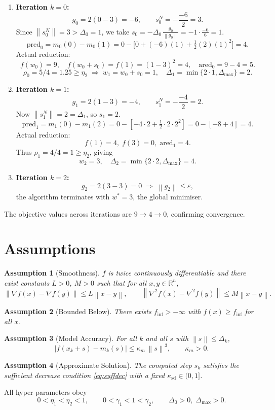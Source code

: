 \documentclass{article}
\newtheorem{assumption}{Assumption}
\newcommand{\RR}{\mathbb{R}}
\newcommand{\norm}[1]{\left\lVert#1\right\rVert}
\begin{document}
\begin{enumerate}
\item \textbf{Iteration $k=0$:}
\[
g_{0}=2(0-3)=-6,\qquad s_{0}^{N}= -\frac{-6}{2}=3.
\]
Since $\norm{s_{0}^{N}}=3>\Delta_{0}=1$, we take $s_{0}= -\Delta_{0}\,\frac{g_{0}}{\norm{g_{0}}}= -1\cdot\frac{-6}{6}=1$.
\[
\text{pred}_{0}=m_{0}(0)-m_{0}(1)=0- \bigl[0+(-6)(1)+\tfrac12(2)(1)^{2}\bigr]=4.
\]
Actual reduction:
\[
f(w_{0})=9,\quad f(w_{0}+s_{0})=f(1)=(1-3)^{2}=4,\quad
\text{ared}_{0}=9-4=5.
\]
\[
\rho_{0}=5/4=1.25\ge \eta_{2}\;\Longrightarrow\;
w_{1}=w_{0}+s_{0}=1,\quad 
\Delta_{1}= \min\{2\cdot1,\Delta_{\max}\}=2.
\]

\item \textbf{Iteration $k=1$:}
\[
g_{1}=2(1-3)=-4,\qquad s_{1}^{N}= -\frac{-4}{2}=2.
\]
Now $\norm{s_{1}^{N}}=2=\Delta_{1}$, so $s_{1}=2$.
\[
\text{pred}_{1}=m_{1}(0)-m_{1}(2)=0-[-4\cdot2+\tfrac12\cdot2\cdot 2^{2}]=0-[-8+4]=4.
\]
Actual reduction:
\[
f(1)=4,\; f(3)=0,\; \text{ared}_{1}=4.
\]
Thus $\rho_{1}=4/4=1\ge\eta_{2}$, giving
\[
w_{2}=3,\quad \Delta_{2}= \min\{2\cdot2,\Delta_{\max}\}=4.
\]

\item \textbf{Iteration $k=2$:}
\[
g_{2}=2(3-3)=0\;\Longrightarrow\; \norm{g_{2}}\le\varepsilon,
\]
the algorithm terminates with $w^{*}=3$, the global minimiser.
\end{enumerate}
The objective values across iterations are $9\rightarrow4\rightarrow0$, confirming convergence.

\newpage
\section*{Assumptions}
\begin{assumption}[Smoothness]\label{ass:smooth}
$f$ is twice continuously differentiable and there exist constants $L>0$, $M>0$ such that for all $x,y\in\RR^{n}$,
\[
\norm{\nabla f(x)-\nabla f(y)}\le L\norm{x-y},
\qquad
\norm{\nabla^{2}f(x)-\nabla^{2}f(y)}\le M\norm{x-y}.
\]
\end{assumption}
\begin{assumption}[Bounded Below]\label{ass:bound}
There exists $f_{\inf}>-\infty$ with $f(x)\ge f_{\inf}$ for all $x$.
\end{assumption}
\begin{assumption}[Model Accuracy]\label{ass:model}
For all $k$ and all $s$ with $\norm{s}\le\Delta_{k}$,
\[
\bigl| f(x_{k}+s)-m_{k}(s) \bigr|\le \kappa_{m}\,\norm{s}^{3},
\qquad\kappa_{m}>0.
\]
\end{assumption}
\begin{assumption}[Approximate Solution]\label{ass:approx}
The computed step $s_{k}$ satisfies the sufficient decrease condition \eqref{eq:suffdec} with a fixed $\kappa_{\mathrm{sd}}\in(0,1]$.
\end{assumption}
All hyper‑parameters obey
\[
0<\eta_{1}<\eta_{2}<1,\qquad
0<\gamma_{1}<1<\gamma_{2},\qquad
\Delta_{0}>0,\;\Delta_{\max}>0.
\]
\end{document}
